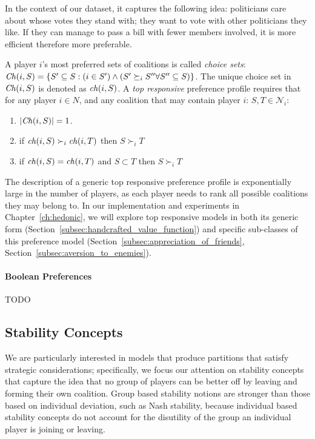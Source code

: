 In the context of our dataset, it captures the following idea:
politicians care about whose votes they stand with;
they want to vote with other politicians they like.
If they can manage to pass a bill with fewer members involved,
it is more efficient therefore more preferable.

A player $i$'s most preferred sets of coalitions is called \textit{choice sets}:
$\mathit{Ch}(i, S) = \{S' \subseteq S: (i \in S') \wedge (S' \succeq_i S'' \forall S'' \subseteq S)\}$.
The unique choice set in $\mathit{Ch}(i, S)$ is denoted as $\mathit{ch}(i, S)$.
A {\em top responsive} preference profile requires that for any player $i \in N$,
and any coalition that may contain player $i$: $S, T \in \mathcal{N}_i$:
\begin{enumerate}
  \item $|\mathit{Ch}(i, S)| = 1$.
  \item if $\mathit{ch}(i, S) \succ_i \mathit{ch}(i, T)$ then $S \succ_i T$
  \item if $\mathit{ch}(i, S) = \mathit{ch}(i, T)$ and $S \subset T$ then $S \succ_i T$
\end{enumerate}

The description of a generic top responsive preference profile is exponentially
large in the number of players, as each player needs to rank all possible
coalitions they may belong to.
In our implementation and experiments in Chapter~\ref{ch:hedonic}, we will
explore top responsive models in both its generic form
(Section~\ref{subsec:handcrafted_value_function}) and specific sub-classes of
this preference model (Section~\ref{subsec:appreciation_of_friends},
Section~\ref{subsec:aversion_to_enemies}).

\paragraph{Boolean Preferences}
TODO

\subsection{Stability Concepts} \label{subsec:stability}
We are particularly interested in models that produce partitions that satisfy
strategic considerations; specifically, we focus our attention on stability
concepts that capture the idea that no group of players can be better off by
leaving and forming their own coalition.
Group based stability notions are stronger than those based on individual deviation,
such as Nash stability, because individual based stability concepts do not account
for the disutility of the group an individual player is joining or leaving.

